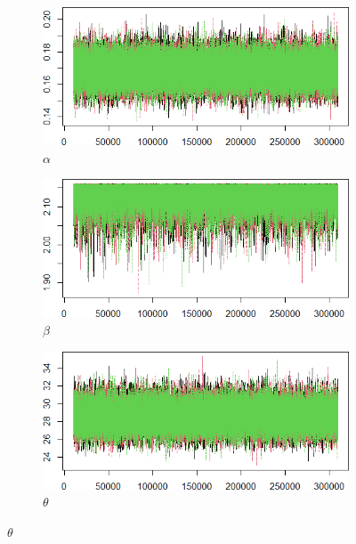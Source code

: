 \documentclass{Class/julia}
\begin{document}
\begin{figure}[!ht]
    \centering
    \caption{Trace Plots After Thinning (\texttt{itamtplcost})}
    \label{fig:13}
    \begin{subfigure}{0.45\textwidth}
        \centering
        \includegraphics[width=\textwidth]{itamtplcost/trace_after_thinning_alpha.png}
        \caption{\( \alpha \)}
    \end{subfigure}
    \hfill
    \begin{subfigure}{0.45\textwidth}
        \centering
        \includegraphics[width=\textwidth]{itamtplcost/trace_after_thinning_beta.png}
        \caption{\( \beta \)}
    \end{subfigure}

    \vspace{1em}

    \begin{subfigure}{0.45\textwidth}
        \centering
        \includegraphics[width=\textwidth]{itamtplcost/trace_after_thinning_theta.png}
        \caption{\( \theta \)}
    \end{subfigure}
\end{figure}
\end{document}
